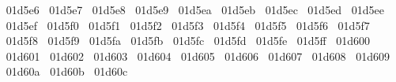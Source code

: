 {  ^^^^^^01d5e6%
  ^^^^^^01d5e7%
  ^^^^^^01d5e8%
  ^^^^^^01d5e9%
  ^^^^^^01d5ea%
  ^^^^^^01d5eb%
  ^^^^^^01d5ec%
  ^^^^^^01d5ed%
  ^^^^^^01d5ee%
  ^^^^^^01d5ef%
  ^^^^^^01d5f0%
  ^^^^^^01d5f1%
  ^^^^^^01d5f2%
  ^^^^^^01d5f3%
  ^^^^^^01d5f4%
  ^^^^^^01d5f5%
  ^^^^^^01d5f6%
  ^^^^^^01d5f7%
  ^^^^^^01d5f8%
  ^^^^^^01d5f9%
  ^^^^^^01d5fa%
  ^^^^^^01d5fb%
  ^^^^^^01d5fc%
  ^^^^^^01d5fd%
  ^^^^^^01d5fe%
  ^^^^^^01d5ff%
  ^^^^^^01d600%
  ^^^^^^01d601%
  ^^^^^^01d602%
  ^^^^^^01d603%
  ^^^^^^01d604%
  ^^^^^^01d605%
  ^^^^^^01d606%
  ^^^^^^01d607%
  ^^^^^^01d608%
  ^^^^^^01d609%
  ^^^^^^01d60a%
  ^^^^^^01d60b%
  ^^^^^^01d60c%
}
